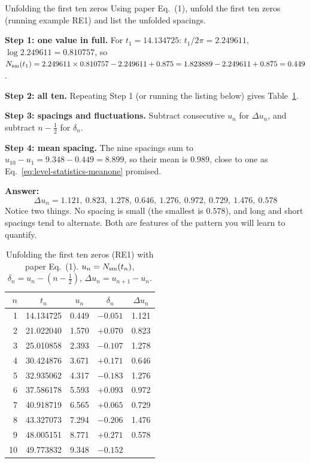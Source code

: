 \begin{sample}{Unfolding the first ten zeros}
Using paper Eq.~(1), unfold the first ten zeros (running example RE1) and list the unfolded spacings.

\textbf{Step 1: one value in full.} For $t_1=14.134725$: $t_1/2\pi=2.249611$, $\log 2.249611=0.810757$, so
$N_{\mathrm{sm}}(t_1)=2.249611\times0.810757-2.249611+0.875=1.823889-2.249611+0.875=0.449$.

\textbf{Step 2: all ten.} Repeating Step 1 (or running the listing below) gives Table~\ref{tab:level-statistics-re1}.

\textbf{Step 3: spacings and fluctuations.} Subtract consecutive $u_n$ for $\Delta u_n$, and subtract $n-\tfrac12$ for $\delta_n$.

\textbf{Step 4: mean spacing.} The nine spacings sum to $u_{10}-u_1=9.348-0.449=8.899$, so their mean is $0.989$, close to one as Eq.~\eqref{eq:level-statistics-meanone} promised.

\textbf{Answer:} \[\boxed{\Delta u_n = 1.121,\ 0.823,\ 1.278,\ 0.646,\ 1.276,\ 0.972,\ 0.729,\ 1.476,\ 0.578}\]
Notice two things. No spacing is small (the smallest is $0.578$), and long and short spacings tend to alternate. Both are features of the pattern you will learn to quantify.
\end{sample}

\begin{table}[htbp]\centering
\caption{Unfolding the first ten zeros (RE1) with paper Eq.~(1). $u_n=N_{\mathrm{sm}}(t_n)$, $\delta_n=u_n-(n-\tfrac12)$, $\Delta u_n=u_{n+1}-u_n$.}
\label{tab:level-statistics-re1}
\begin{tabular}{rcccc}
\toprule
$n$ & $t_n$ & $u_n$ & $\delta_n$ & $\Delta u_n$ \\
\midrule
1 & 14.134725 & 0.449 & $-0.051$ & 1.121\\
2 & 21.022040 & 1.570 & $+0.070$ & 0.823\\
3 & 25.010858 & 2.393 & $-0.107$ & 1.278\\
4 & 30.424876 & 3.671 & $+0.171$ & 0.646\\
5 & 32.935062 & 4.317 & $-0.183$ & 1.276\\
6 & 37.586178 & 5.593 & $+0.093$ & 0.972\\
7 & 40.918719 & 6.565 & $+0.065$ & 0.729\\
8 & 43.327073 & 7.294 & $-0.206$ & 1.476\\
9 & 48.005151 & 8.771 & $+0.271$ & 0.578\\
10 & 49.773832 & 9.348 & $-0.152$ & \\
\bottomrule
\end{tabular}
\end{table}

